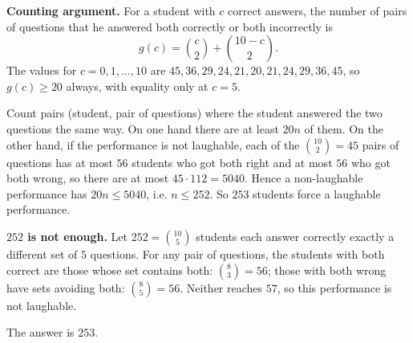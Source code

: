 \textbf{Counting argument.} For a student with $c$ correct answers, the number of pairs of questions that he answered both correctly or both incorrectly is
\[
g(c)=\binom c2+\binom{10-c}{2}.
\]
The values for $c=0,1,\dots,10$ are $45,36,29,24,21,20,21,24,29,36,45$, so $g(c)\ge20$ always, with equality only at $c=5$.

Count pairs (student, pair of questions) where the student answered the two questions the same way. On one hand there are at least $20n$ of them. On the other hand, if the performance is not laughable, each of the $\binom{10}{2}=45$ pairs of questions has at most $56$ students who got both right and at most $56$ who got both wrong, so there are at most $45\cdot112=5040$. Hence a non-laughable performance has $20n\le5040$, i.e. $n\le252$. So $253$ students force a laughable performance.

\textbf{$252$ is not enough.} Let $252=\binom{10}{5}$ students each answer correctly exactly a different set of $5$ questions. For any pair of questions, the students with both correct are those whose set contains both: $\binom83=56$; those with both wrong have sets avoiding both: $\binom85=56$. Neither reaches $57$, so this performance is not laughable.

The answer is $\boxed{253}$.
